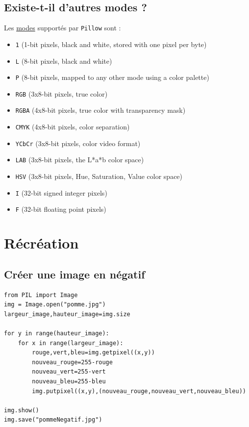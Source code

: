 \documentclass[11pt]{article}
\begin{document}
\subsection{Existe-t-il d'autres modes ?}
\label{sec:org53d9dfa}

Les \href{https://pillow.readthedocs.io/en/latest/handbook/concepts.html\#modes}{modes} supportés par \texttt{Pillow} sont : 

\begin{itemize}
\item \texttt{1} (1-bit pixels, black and white, stored with one pixel per byte)
\item \texttt{L} (8-bit pixels, black and white)
\item \texttt{P} (8-bit pixels, mapped to any other mode using a color palette)
\item \texttt{RGB} (3x8-bit pixels, true color)
\item \texttt{RGBA} (4x8-bit pixels, true color with transparency mask)
\item \texttt{CMYK} (4x8-bit pixels, color separation)
\item \texttt{YCbCr} (3x8-bit pixels, color video format)
\item \texttt{LAB} (3x8-bit pixels, the L*a*b color space)
\item \texttt{HSV} (3x8-bit pixels, Hue, Saturation, Value color space)
\item \texttt{I} (32-bit signed integer pixels)
\item \texttt{F} (32-bit floating point pixels)
\end{itemize}



\section{Récréation}
\label{sec:org6a5a4e1}

\subsection{Créer une image en négatif}
\label{sec:org0f4a58d}

\begin{verbatim}
from PIL import Image
img = Image.open("pomme.jpg")
largeur_image,hauteur_image=img.size

for y in range(hauteur_image):
    for x in range(largeur_image):
        rouge,vert,bleu=img.getpixel((x,y))
        nouveau_rouge=255-rouge
        nouveau_vert=255-vert
        nouveau_bleu=255-bleu
        img.putpixel((x,y),(nouveau_rouge,nouveau_vert,nouveau_bleu))

img.show()
img.save("pommeNegatif.jpg")
\end{verbatim}
\end{document}
